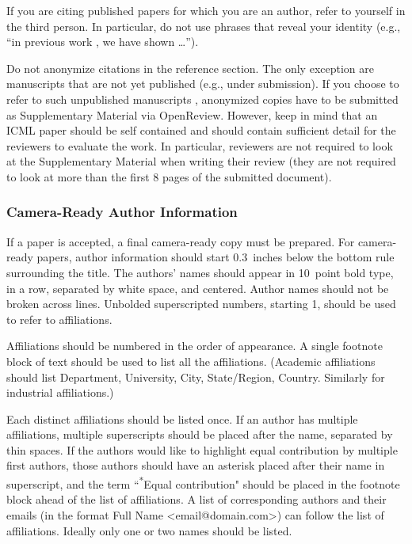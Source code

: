 \documentclass{article}
\theoremstyle{plain}
\theoremstyle{definition}
\theoremstyle{remark}
\begin{document}
If you are citing published papers for which you are an author, refer
to yourself in the third person. In particular, do not use phrases
that reveal your identity (e.g., ``in previous work \cite{langley00}, we
have shown \ldots'').

Do not anonymize citations in the reference section. The only exception are manuscripts that are
not yet published (e.g., under submission). If you choose to refer to
such unpublished manuscripts \cite{anonymous}, anonymized copies have
to be submitted
as Supplementary Material via OpenReview\@. However, keep in mind that an ICML
paper should be self contained and should contain sufficient detail
for the reviewers to evaluate the work. In particular, reviewers are
not required to look at the Supplementary Material when writing their
review (they are not required to look at more than the first $8$ pages of the submitted document).

\subsubsection{Camera-Ready Author Information}
\label{final author}

If a paper is accepted, a final camera-ready copy must be prepared.
%
For camera-ready papers, author information should start 0.3~inches below the
bottom rule surrounding the title. The authors' names should appear in 10~point
bold type, in a row, separated by white space, and centered. Author names should
not be broken across lines. Unbolded superscripted numbers, starting 1, should
be used to refer to affiliations.

Affiliations should be numbered in the order of appearance. A single footnote
block of text should be used to list all the affiliations. (Academic
affiliations should list Department, University, City, State/Region, Country.
Similarly for industrial affiliations.)

Each distinct affiliations should be listed once. If an author has multiple
affiliations, multiple superscripts should be placed after the name, separated
by thin spaces. If the authors would like to highlight equal contribution by
multiple first authors, those authors should have an asterisk placed after their
name in superscript, and the term ``\textsuperscript{*}Equal contribution"
should be placed in the footnote block ahead of the list of affiliations. A
list of corresponding authors and their emails (in the format Full Name
\textless{}email@domain.com\textgreater{}) can follow the list of affiliations.
Ideally only one or two names should be listed.
\end{document}
